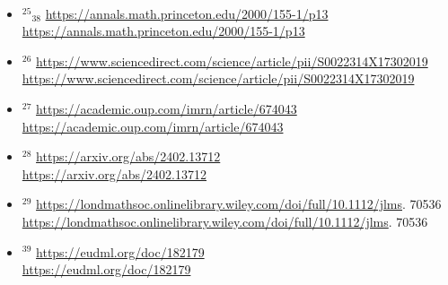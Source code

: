 \documentclass[10pt]{article}
\begin{document}
\\
\begin{itemize}
  \item[] ${ }^{25}{ }_{38}$ \href{https://annals.math.princeton.edu/2000/155-1/p13}{https://annals.math.princeton.edu/2000/155-1/p13}\\
\href{https://annals.math.princeton.edu/2000/155-1/p13}{https://annals.math.princeton.edu/2000/155-1/p13}
  \item[] ${ }^{26}$ \href{https://www.sciencedirect.com/science/article/pii/S0022314X17302019}{https://www.sciencedirect.com/science/article/pii/S0022314X17302019}\\
\href{https://www.sciencedirect.com/science/article/pii/S0022314X17302019}{https://www.sciencedirect.com/science/article/pii/S0022314X17302019}
  \item[] ${ }^{27}$ \href{https://academic.oup.com/imrn/article/674043}{https://academic.oup.com/imrn/article/674043}\\
\href{https://academic.oup.com/imrn/article/674043}{https://academic.oup.com/imrn/article/674043}
  \item[] ${ }^{28}$ \href{https://arxiv.org/abs/2402.13712}{https://arxiv.org/abs/2402.13712}\\
\href{https://arxiv.org/abs/2402.13712}{https://arxiv.org/abs/2402.13712}
  \item[] ${ }^{29}$ \href{https://londmathsoc.onlinelibrary.wiley.com/doi/full/10.1112/jlms}{https://londmathsoc.onlinelibrary.wiley.com/doi/full/10.1112/jlms}. 70536\\
\href{https://londmathsoc.onlinelibrary.wiley.com/doi/full/10.1112/jlms}{https://londmathsoc.onlinelibrary.wiley.com/doi/full/10.1112/jlms}. 70536
  \item[] ${ }^{39}$ \href{https://eudml.org/doc/182179}{https://eudml.org/doc/182179}\\
\href{https://eudml.org/doc/182179}{https://eudml.org/doc/182179}
\end{itemize}
\end{document}
